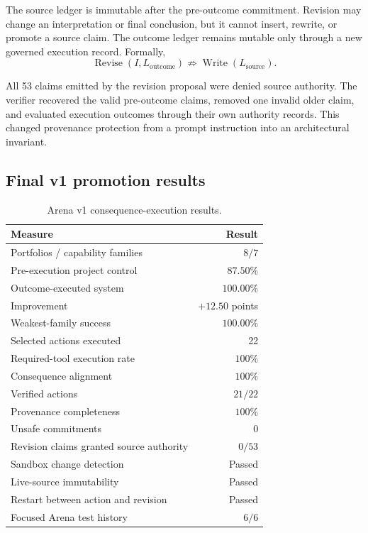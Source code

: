 The source ledger is immutable after the pre-outcome commitment.  Revision may
change an interpretation or final conclusion, but it cannot insert, rewrite,
or promote a source claim.  The outcome ledger remains mutable only through a
new governed execution record.  Formally,
\begin{equation}
\operatorname{Revise}(I,L_{\mathrm{outcome}})
\not\Rightarrow
\operatorname{Write}(L_{\mathrm{source}}).
\label{eq:no-authority-transfer}
\end{equation}

All 53 claims emitted by the revision proposal were denied source authority.
The verifier recovered the valid pre-outcome claims, removed one invalid older
claim, and evaluated execution outcomes through their own authority records.
This changed provenance protection from a prompt instruction into an
architectural invariant.


\subsection{Final v1 promotion results}
\label{subsec:arena-v1-results}

\begin{table}[htbp]
\centering
\caption{Arena v1 consequence-execution results.}
\label{tab:arena-v1-results}
\begin{tabular}{lr}
\hline
Measure & Result \\
\hline
Portfolios / capability families & $8 / 7$ \\
Pre-execution project control & $87.50\%$ \\
Outcome-executed system & $100.00\%$ \\
Improvement & $+12.50$ points \\
Weakest-family success & $100.00\%$ \\
Selected actions executed & 22 \\
Required-tool execution rate & $100\%$ \\
Consequence alignment & $100\%$ \\
Verified actions & $21/22$ \\
Provenance completeness & $100\%$ \\
Unsafe commitments & 0 \\
Revision claims granted source authority & $0/53$ \\
Sandbox change detection & Passed \\
Live-source immutability & Passed \\
Restart between action and revision & Passed \\
Focused Arena test history & $6/6$ \\
\hline
\end{tabular}
\end{table}

